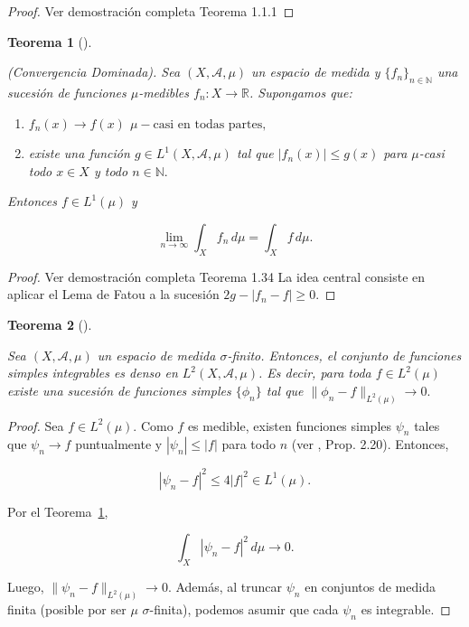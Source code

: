 \documentclass[
  spanish,
  us-letterpaper,
]{scrreprt}
\theoremstyle{plain}
\newtheorem{theorem}{Teorema}[chapter]
\theoremstyle{plain}
\theoremstyle{definition}
\theoremstyle{remark}
\begin{document}
\begin{proof}
Ver demostración completa \textcite{applebaum2009levy} Teorema 1.1.1
\end{proof}

\begin{theorem}[]\protect\hypertarget{thm-con_dom}{}\label{thm-con_dom}

(Convergencia Dominada). Sea \((X, \mathcal{A}, \mu)\) un espacio de
medida y \(\{f_n\}_{n\in\mathbb{N}}\) una sucesión de funciones
\(\mu\)-medibles \(f_n : X \to \mathbb{R}\). Supongamos que:

\begin{enumerate}
\def\labelenumi{\Roman{enumi}.}
\item
  \(f_n(x) \to f(x)\) \(\mu -\text{casi en todas partes,}\)
\item
  existe una función \(g \in L^1(X, \mathcal{A}, \mu)\) tal que
  \(|f_n(x)| \leq g(x)\) para \(\mu\)-casi todo \(x \in X\) y todo
  \(n \in \mathbb{N}.\)
\end{enumerate}

Entonces \(f \in L^1(\mu)\) y

\[\lim_{n \to \infty} \int_X f_n \, d\mu = \int_X f \, d\mu.\]

\end{theorem}

\begin{proof}
Ver demostración completa Teorema 1.34 \autocite{rudin1987real} La idea
central consiste en aplicar el Lema de Fatou a la sucesión
\(2g - |f_n - f| \geq 0\).
\end{proof}

\begin{theorem}[]\protect\hypertarget{thm-aprox_fun_simp}{}\label{thm-aprox_fun_simp}

Sea \((X, \mathcal{A}, \mu)\) un espacio de medida \(\sigma\)-finito.
Entonces, el conjunto de funciones simples integrables es denso en
\(L^2(X, \mathcal{A}, \mu)\). Es decir, para toda \(f \in L^2(\mu)\)
existe una sucesión de funciones simples \(\{\phi_n\}\) tal que
\(\|\phi_n - f\|_{L^2(\mu)} \to 0.\)

\end{theorem}

\begin{proof}
Sea \(f \in L^2(\mu)\). Como \(f\) es medible, existen funciones simples
\(\psi_n\) tales que \(\psi_n \to f\) puntualmente y
\(|\psi_n| \leq |f|\) para todo \(n\) (ver \autocite{folland1999real},
Prop. 2.20). Entonces,

\[|\psi_n - f|^2 \leq 4|f|^2 \in L^1(\mu).\]

Por el Teorema~\ref{thm-con_dom},

\[\int_X |\psi_n - f|^2 \, d\mu \to 0.\]

Luego, \(\|\psi_n - f\|_{L^2(\mu)} \to 0\). Además, al truncar
\(\psi_n\) en conjuntos de medida finita (posible por ser \(\mu\)
\(\sigma\)-finita), podemos asumir que cada \(\psi_n\) es integrable.
\end{proof}
\end{document}
